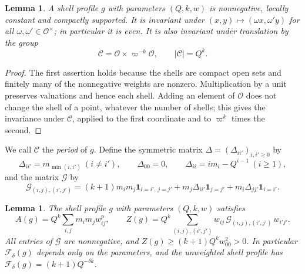 \documentclass[11pt]{amsart}
\numberwithin{equation}{section}
\newtheorem{lemma}[equation]{Lemma}
\theoremstyle{definition}
\theoremstyle{remark}
\begin{document}
\begin{lemma}\label{fw:shell-invariance}
A shell profile $g$ with parameters $(Q,k,w)$ is nonnegative, locally
constant and compactly supported. It is invariant under
$(x,y)\mapsto(\omega x,\omega'y)$ for all $\omega,\omega'\in\mathcal
O^\times$; in particular it is even. It is also invariant under
translation by the group
\begin{equation}\label{fw:hard-period}
 \mathcal C=\mathcal O\times\varpi^{-k}\mathcal O,\qquad |\mathcal C|=Q^k.
\end{equation}
\end{lemma}

\begin{proof}
The first assertion holds because the shells are compact open sets and
finitely many of the nonnegative weights are nonzero. Multiplication by
a unit preserves valuations and hence each shell. Adding an element of
$\mathcal O$ does not change the shell of a point, whatever the number
of shells; this gives the invariance under $\mathcal C$, applied to the
first coordinate and to $\varpi^k$ times the second.
\end{proof}

We call $\mathcal C$ the \emph{period} of $g$. Define the symmetric
matrix $\Delta=(\Delta_{ii'})_{i,i'\ge0}$ by
\[
 \Delta_{ii'}=m_{\min(i,i')}\ (i\ne i'),\qquad \Delta_{00}=0,\qquad
 \Delta_{ii}=im_i-Q^{i-1}\ (i\ge1),
\]
and the matrix $\mathcal G$ by
\[
 \mathcal G_{(i,j),(i',j')}=(k+1)m_im_j\mathbf 1_{i=i',\,j=j'}
 +m_j\Delta_{ii'}\mathbf 1_{j=j'}+m_i\Delta_{jj'}\mathbf 1_{i=i'}.
\]

\begin{lemma}\label{fw:shell-lemma}
The shell profile $g$ with parameters $(Q,k,w)$ satisfies
\begin{equation}\label{fw:shell-kernel}
 A(g)=Q^k\sum_{i,j}m_im_jw_{ij}^p,\qquad
 Z(g)=Q^k\sum_{(i,j),(i',j')}w_{ij}\,\mathcal G_{(i,j),(i',j')}\,w_{i'j'} .
\end{equation}
All entries of $\mathcal G$ are nonnegative, and
$Z(g)\ge(k+1)Q^kw_{00}^2>0$. In particular $\mathcal F_\delta(g)$
depends only on the parameters, and the unweighted shell profile has
$\mathcal F_\delta(g)=(k+1)Q^{-\delta k}$.
\end{lemma}
\end{document}
